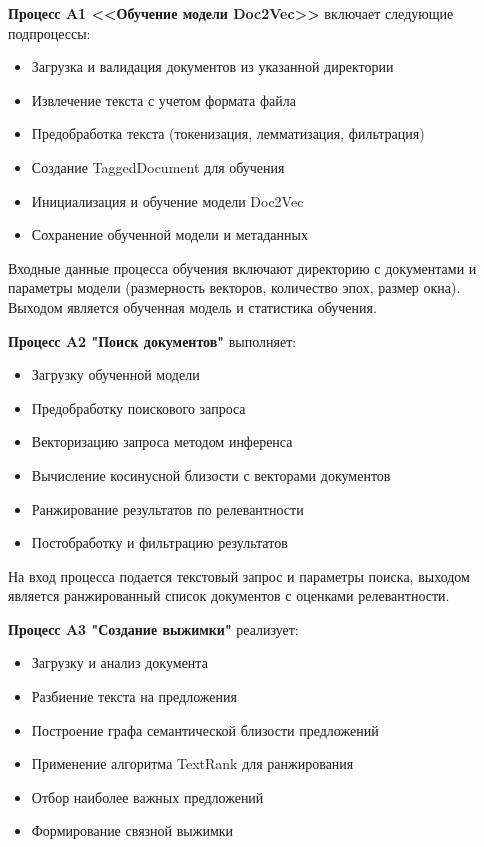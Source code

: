 \textbf{Процесс A1 <<Обучение модели Doc2Vec>>} включает следующие подпроцессы:
\begin{itemize}
	\item Загрузка и валидация документов из указанной директории
	\item Извлечение текста с учетом формата файла
	\item Предобработка текста (токенизация, лемматизация, фильтрация)
	\item Создание TaggedDocument для обучения
	\item Инициализация и обучение модели Doc2Vec
	\item Сохранение обученной модели и метаданных
\end{itemize}

Входные данные процесса обучения включают директорию с документами и параметры модели (размерность векторов, количество эпох, размер окна). Выходом является обученная модель и статистика обучения.

\textbf{Процесс A2 "Поиск документов"} выполняет:
\begin{itemize}
	\item Загрузку обученной модели
	\item Предобработку поискового запроса
	\item Векторизацию запроса методом инференса
	\item Вычисление косинусной близости с векторами документов
	\item Ранжирование результатов по релевантности
	\item Постобработку и фильтрацию результатов
\end{itemize}

На вход процесса подается текстовый запрос и параметры поиска, выходом является ранжированный список документов с оценками релевантности.

\textbf{Процесс A3 "Создание выжимки"} реализует:
\begin{itemize}
	\item Загрузку и анализ документа
	\item Разбиение текста на предложения
	\item Построение графа семантической близости предложений
	\item Применение алгоритма TextRank для ранжирования
	\item Отбор наиболее важных предложений
	\item Формирование связной выжимки
\end{itemize}

